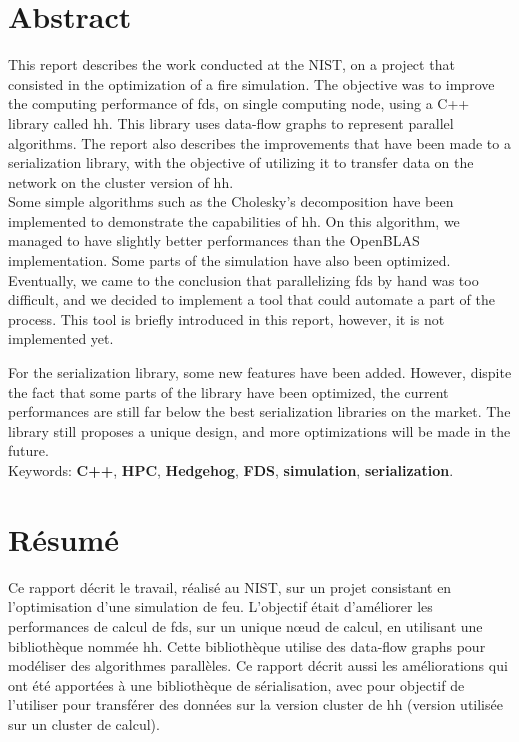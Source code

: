 
\section*{Abstract}

This report describes the work conducted at the NIST, on a project that
consisted in the optimization of a fire simulation. The objective was to improve
the computing performance of \gls{fds}, on single computing node, using a C++
library called \gls{hh}. This library uses data-flow graphs to represent
parallel algorithms. The report also describes the improvements that have been
made to a serialization library, with the objective of utilizing it to transfer
data on the network on the cluster version of \gls{hh}.\\

Some simple algorithms such as the Cholesky's decomposition have been
implemented to demonstrate the capabilities of \gls{hh}. On this algorithm, we
managed to have slightly better performances than the OpenBLAS implementation.
Some parts of the simulation have also been optimized. Eventually, we came to
the conclusion that parallelizing \gls{fds} by hand was too difficult, and we
decided to implement a tool that could automate a part of the process. This tool
is briefly introduced in this report, however, it is not implemented yet.

For the serialization library, some new features have been added. However,
dispite the fact that some parts of the library have been optimized, the current
performances are still far below the best serialization libraries on the
market. The library still proposes a unique design, and more optimizations will
be made in the future.\\

Keywords: \textbf{C++}, \textbf{HPC}, \textbf{Hedgehog}, \textbf{FDS},
\textbf{simulation}, \textbf{serialization}.

\section*{Résumé}

Ce rapport décrit le travail, réalisé au NIST, sur un projet consistant en
l'optimisation d'une simulation de feu. L'objectif était d'améliorer les
performances de calcul de \gls{fds}, sur un unique nœud de calcul, en utilisant
une bibliothèque nommée \gls{hh}. Cette bibliothèque utilise des data-flow
graphs pour modéliser des algorithmes parallèles. Ce rapport décrit aussi les
améliorations qui ont été apportées à une bibliothèque de sérialisation, avec
pour objectif de l'utiliser pour transférer des données sur la version cluster
de \gls{hh} (version utilisée sur un cluster de calcul).\\

